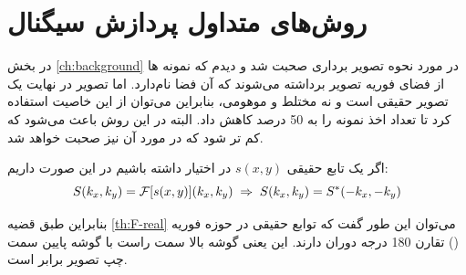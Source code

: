 \section{روش‌های متداول پردازش سیگنال}
در بخش \ref{ch:background} در مورد نحوه تصویر برداری \mri صحبت شد و دیدم که نمونه ها از فضای فوریه تصویر برداشته می‌شوند که آن فضا \kspace نام‌دارد. اما تصویر در نهایت یک تصویر حقیقی است و نه مختلط و موهومی، بنابراین می‌توان از این خاصیت استفاده کرد تا تعداد اخذ نمونه را به 50 درصد کاهش داد. البته در این روش باعث می‌شود که  کم تر شود که در مورد آن نیز صحبت خواهد شد.

\begin{قضیه}\label{th:F-real}
اگر یک تابع حقیقی $s(x,y)$ در اختیار داشته باشیم در این صورت داریم:
$$S(k_x, k_y) = \mathcal{F}[s(x,y)](k_x, k_y) \; \Rightarrow \; S(k_x, k_y) = S^*(-k_x,-k_y) $$
\end{قضیه}

بنابراین طبق قضیه \ref{th:F-real}
می‌توان این طور گفت که توابع حقیقی در حوزه فوریه (\kspace)
تقارن 180 درجه دوران دارند. این یعنی گوشه بالا سمت راست \kspace با گوشه پایین سمت چپ تصویر برابر است.





\begin{figure}[t!]
	\centering
	\begin{copyrightBox}{0.7\linewidth}{}
	\centering
	\hspace{0.15\linewidth}
	\end{copyrightBox}
	\removevspace[1]
	\caption{}
	\label{fig:half-fourier}
\end{figure}



